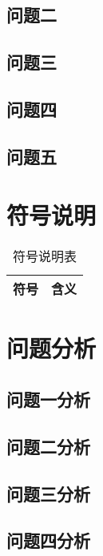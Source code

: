 \documentclass{article}
\begin{document}
\subsection{问题二}

\subsection{问题三}

\subsection{问题四}

\subsection{问题五}

\section{符号说明}

\begin{table}[H]
\centering
\caption{符号说明表}
\begin{tabular}{|c|l|}
\hline
符号 & 含义 \\
\hline

\hline
\end{tabular}
\end{table}

\section{问题分析}

\subsection{问题一分析}

\subsection{问题二分析}

\subsection{问题三分析}

\subsection{问题四分析}
\end{document}
